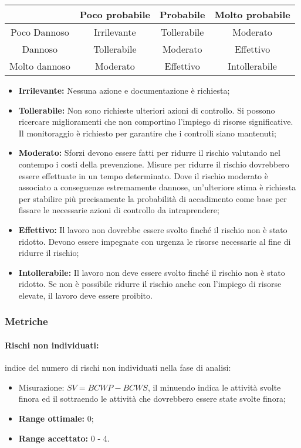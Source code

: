 	\begin{table}
		\center
		\begin{tabular}{|c|c|c|c|}
			\hline
			~             & Poco probabile & Probabile   & Molto probabile \\ \hline
			Poco Dannoso  & Irrilevante    & Tollerabile & Moderato        \\ \hline
			Dannoso       & Tollerabile    & Moderato    & Effettivo       \\ \hline
			Molto dannoso & Moderato       & Effettivo   & Intollerabile   \\
			\hline
		\end{tabular}
	\end{table}

	\begin{itemize}
		\item \textbf{Irrilevante: }Nessuna azione e documentazione è richiesta;
		
 		\item \textbf{Tollerabile:} Non sono richieste ulteriori azioni di controllo. Si possono ricercare miglioramenti che non comportino l'impiego di risorse significative. Il monitoraggio è richiesto per garantire che i controlli siano mantenuti;		
		\item \textbf{Moderato:} Sforzi devono essere fatti per ridurre il rischio valutando nel contempo i costi della prevenzione. Misure per ridurre il rischio dovrebbero essere effettuate in un tempo determinato. Dove il rischio moderato è associato a conseguenze estremamente dannose, un'ulteriore stima è richiesta per stabilire più precisamente la probabilità di accadimento come base per fissare le necessarie azioni di controllo da intraprendere;
		
		\item \textbf{Effettivo:} Il lavoro non dovrebbe essere svolto finché il rischio non è stato ridotto. Devono essere impegnate con urgenza le risorse necessarie al fine di ridurre il rischio;
		
		\item \textbf{Intollerabile:} Il lavoro non deve essere svolto finché il rischio non è stato ridotto. Se non è possibile ridurre il rischio anche con l'impiego di risorse elevate, il lavoro deve essere proibito.
	\end{itemize}
\subsubsection{Metriche}
\paragraph{Rischi non individuati:}
indice del numero di rischi non individuati nella fase di analisi:
	\begin{itemize}
		\item Misurazione: $SV = BCWP - BCWS$, il minuendo indica le attività svolte finora ed il sottraendo le attività che dovrebbero essere state svolte finora;
		\item \textbf{Range ottimale: } 0;
		\item \textbf{Range accettato: } 0 - 4.
	\end{itemize}


